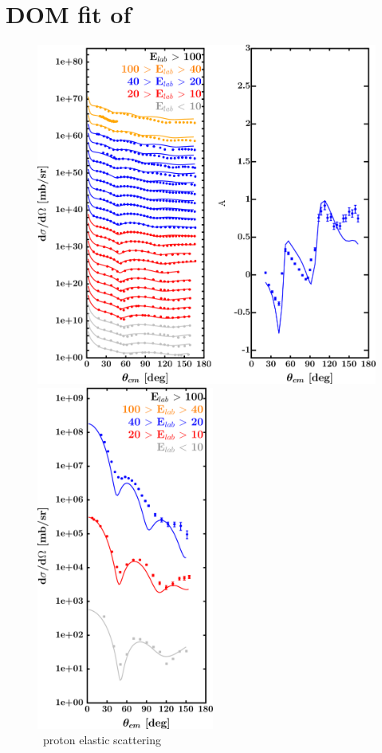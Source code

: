 \section{DOM fit of \oEight}
\label{o18DOMOutput}
\begin{figure}[hbtp]
    \centering
    \begin{minipage}{0.47\textwidth}
        \centering
        \includegraphics[width=\textwidth]{figures/o18_protonElastic.png}
        \caption*{\oEight\ proton elastic scattering}
        \label{DOMFitData_o18_proton_elastic}
    \end{minipage}\hspace{6pt}
    \begin{minipage}{0.47\textwidth}
        \centering
        \includegraphics[width=0.52\textwidth]{figures/o18_neutronElastic.png}

\end{minipage}
\end{figure}
